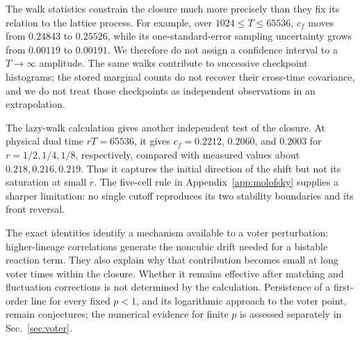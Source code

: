 The walk statistics constrain the closure much more precisely than they fix
its relation to the lattice process. For example, over $1024\le T\le65536$,
$c_f$ moves from $0.24843$ to $0.25526$, while its one-standard-error sampling
uncertainty grows from $0.00119$ to $0.00191$. We therefore do not assign a
confidence interval to a $T\to\infty$ amplitude. The same walks contribute
to successive checkpoint histograms; the stored marginal counts do not
recover their cross-time covariance, and we do not treat those checkpoints
as independent observations in an extrapolation.

The lazy-walk calculation gives another independent test of the closure.
At physical dual time $rT=65536$, it gives $c_f=0.2212$, $0.2060$, and
$0.2003$ for $r=1/2,1/4,1/8$, respectively, compared with measured values
about $0.218,0.216,0.219$. Thus it captures the initial direction of the shift
but not its saturation at small $r$. The five-cell rule in
Appendix~\ref{app:molofsky} supplies a sharper limitation: no single cutoff
reproduces its two stability boundaries and its front reversal.

The exact identities identify a mechanism available to a voter perturbation:
higher-lineage correlations generate the noncubic drift needed for a bistable
reaction term. They also explain why that contribution becomes small at long
voter times within the closure. Whether it remains effective after matching
and fluctuation corrections is not determined by the calculation. Persistence
of a first-order line for every fixed $p<1$, and its logarithmic approach to
the voter point, remain conjectures; the numerical evidence for finite $p$
is assessed separately in Sec.~\ref{sec:voter}.
